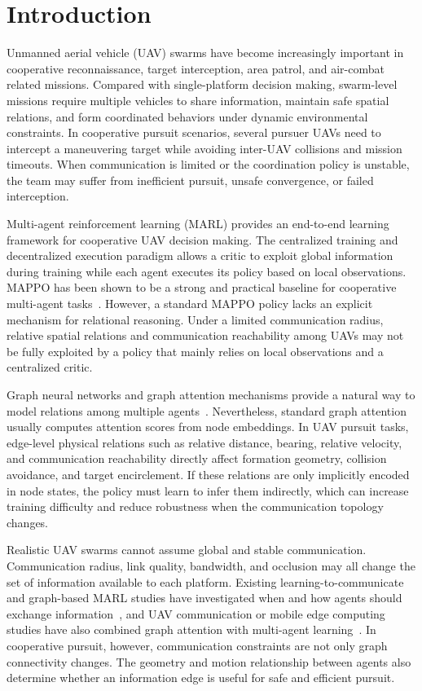 \section{Introduction}

Unmanned aerial vehicle (UAV) swarms have become increasingly important in cooperative reconnaissance, target interception, area patrol, and air-combat related missions. Compared with single-platform decision making, swarm-level missions require multiple vehicles to share information, maintain safe spatial relations, and form coordinated behaviors under dynamic environmental constraints. In cooperative pursuit scenarios, several pursuer UAVs need to intercept a maneuvering target while avoiding inter-UAV collisions and mission timeouts. When communication is limited or the coordination policy is unstable, the team may suffer from inefficient pursuit, unsafe convergence, or failed interception.

Multi-agent reinforcement learning (MARL) provides an end-to-end learning framework for cooperative UAV decision making. The centralized training and decentralized execution paradigm allows a critic to exploit global information during training while each agent executes its policy based on local observations. MAPPO has been shown to be a strong and practical baseline for cooperative multi-agent tasks~\cite{yu2021mappo}. However, a standard MAPPO policy lacks an explicit mechanism for relational reasoning. Under a limited communication radius, relative spatial relations and communication reachability among UAVs may not be fully exploited by a policy that mainly relies on local observations and a centralized critic.

Graph neural networks and graph attention mechanisms provide a natural way to model relations among multiple agents~\cite{velickovic2017gat,malysheva2020magnet,liu2024gnn_marl}. Nevertheless, standard graph attention usually computes attention scores from node embeddings. In UAV pursuit tasks, edge-level physical relations such as relative distance, bearing, relative velocity, and communication reachability directly affect formation geometry, collision avoidance, and target encirclement. If these relations are only implicitly encoded in node states, the policy must learn to infer them indirectly, which can increase training difficulty and reduce robustness when the communication topology changes.

Realistic UAV swarms cannot assume global and stable communication. Communication radius, link quality, bandwidth, and occlusion may all change the set of information available to each platform. Existing learning-to-communicate and graph-based MARL studies have investigated when and how agents should exchange information~\cite{singh2018ic3net,cuzin2026gnn_comm_survey}, and UAV communication or mobile edge computing studies have also combined graph attention with multi-agent learning~\cite{feng2024gat_uav_comm,kim2024uav_mec_madrl}. In cooperative pursuit, however, communication constraints are not only graph connectivity changes. The geometry and motion relationship between agents also determine whether an information edge is useful for safe and efficient pursuit.

